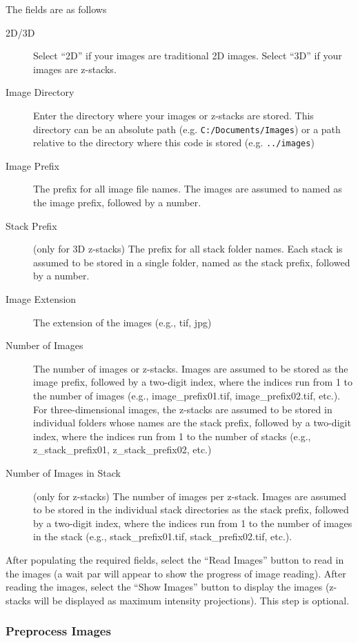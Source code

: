 \documentclass[12pt]{article}
\begin{document}
The fields are as follows
\begin{description}
%
\item[2D/3D] Select ``2D'' if your images are traditional 2D images. Select ``3D'' if your images are z-stacks.
%
\item[Image Directory] Enter the directory where your images or z-stacks are stored. This directory can be an absolute path (e.g. \texttt{C:/Documents/Images}) or a path relative to the directory where this code is stored (e.g. \texttt{../images})
%
\item[Image Prefix] The prefix for all image file names. The images are assumed to named as the image prefix, followed by a number. 
%
\item[Stack Prefix] (only for 3D z-stacks) The prefix for all stack folder names. Each stack is assumed to be stored in a single folder, named as the stack prefix, followed by a number. 
%
\item[Image Extension] The extension of the images (e.g., tif, jpg)
%
\item[Number of Images] The number of images or z-stacks. Images are assumed to be stored as the image prefix, followed by a two-digit index, where the indices run from 1 to the number of images (e.g., image\_prefix01.tif, image\_prefix02.tif, etc.). For three-dimensional images, the z-stacks are assumed to be stored in individual folders whose names are the stack prefix, followed by a two-digit index, where the indices run from 1 to the number of stacks (e.g., z\_stack\_prefix01, z\_stack\_prefix02, etc.)
%
\item[Number of Images in Stack] (only for z-stacks) The number of images per z-stack. Images are assumed to be stored in the individual stack directories as the stack prefix, followed by a two-digit index, where the indices run from 1 to the number of images in the stack (e.g., stack\_prefix01.tif, stack\_prefix02.tif, etc.). 
%
\end{description}

After populating the required fields, select the ``Read Images'' button to read in the images (a wait par will appear to show the progress of image reading).
%
After reading the images, select the ``Show Images'' button to display the images (z-stacks will be displayed as maximum intensity projections). This step is optional.

\subsubsection{Preprocess Images}
\end{document}
